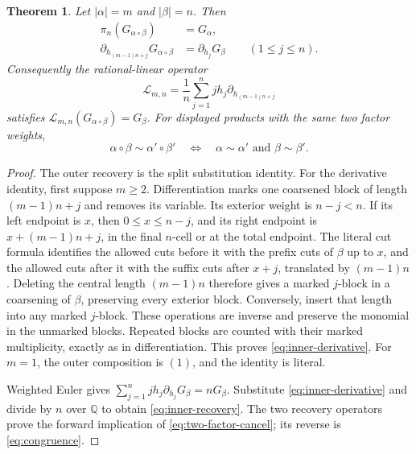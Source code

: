 \documentclass[11pt,a4paper]{amsart}
\numberwithin{equation}{section}
\theoremstyle{plain}
\newtheorem{theorem}{Theorem}[section]
\theoremstyle{definition}
\newcommand{\Q}{\mathbb Q}
\begin{document}
\begin{theorem}\label{thm:recovery}
Let \(|\alpha|=m\) and \(|\beta|=n\).  Then
\begin{align}
\pi_n(G_{\alpha\circ\beta})&=G_\alpha,
\label{eq:outer-recovery}\\
\partial_{h_{(m-1)n+j}}G_{\alpha\circ\beta}
&=\partial_{h_j}G_\beta\qquad(1\le j\le n).
\label{eq:inner-derivative}
\end{align}
Consequently the rational-linear operator
\begin{equation}\label{eq:inner-recovery}
\mathcal L_{m,n}=\frac1n\sum_{j=1}^n
j h_j\partial_{h_{(m-1)n+j}}
\end{equation}
satisfies \(\mathcal L_{m,n}(G_{\alpha\circ\beta})=G_\beta\).
For displayed products with the same two factor weights,
\begin{equation}\label{eq:two-factor-cancel}
\alpha\circ\beta\sim\alpha'\circ\beta'
\quad\Longleftrightarrow\quad
\alpha\sim\alpha'\text{ and }\beta\sim\beta'.
\end{equation}
\end{theorem}
\begin{proof}
The outer recovery is the split substitution identity.  For the derivative
identity, first suppose \(m\ge2\).  Differentiation marks one coarsened
block of length \((m-1)n+j\) and removes its variable.  Its exterior
weight is \(n-j<n\).  If its left endpoint is \(x\), then
\(0\le x\le n-j\), and its right endpoint is
\(x+(m-1)n+j\), in the final \(n\)-cell or at the total endpoint.
The literal cut formula identifies the allowed cuts before it with the
prefix cuts of \(\beta\) up to \(x\), and the allowed cuts after it
with the suffix cuts after \(x+j\), translated by \((m-1)n\).
Deleting the central length \((m-1)n\) therefore gives a marked
\(j\)-block in a coarsening of \(\beta\), preserving every exterior
block.  Conversely, insert that length into any marked \(j\)-block.
These operations are inverse and preserve the monomial in the unmarked
blocks.  Repeated blocks are counted with their marked multiplicity,
exactly as in differentiation.  This proves \eqref{eq:inner-derivative}.
For \(m=1\), the outer composition is \((1)\), and the identity is
literal.

Weighted Euler gives
\(\sum_{j=1}^n jh_j\partial_{h_j}G_\beta=nG_\beta\).
Substitute \eqref{eq:inner-derivative} and divide by \(n\) over \(\Q\)
to obtain \eqref{eq:inner-recovery}.  The two recovery operators prove
the forward implication of \eqref{eq:two-factor-cancel}; its reverse is
\eqref{eq:congruence}.
\end{proof}
\end{document}
